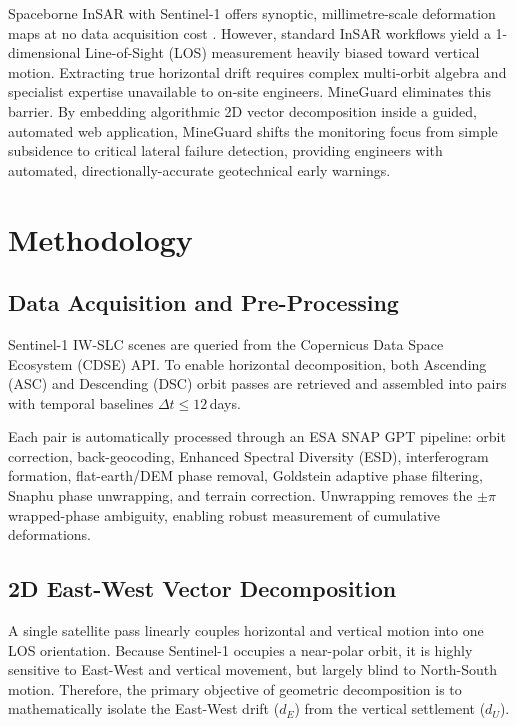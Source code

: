 \documentclass[conference]{IEEEtran}
\begin{document}
Spaceborne InSAR with Sentinel-1 offers synoptic, millimetre-scale
deformation maps at no data acquisition cost \cite{massonnet1998,
berardino2002}. However, standard InSAR workflows yield a 1-dimensional
Line-of-Sight (LOS) measurement heavily biased toward vertical motion.
Extracting true horizontal drift requires complex multi-orbit algebra
and specialist expertise unavailable to on-site engineers.
MineGuard eliminates this barrier. By embedding algorithmic 2D vector
decomposition inside a guided, automated web application, MineGuard
shifts the monitoring focus from simple subsidence to critical lateral
failure detection, providing engineers with automated, directionally-accurate
geotechnical early warnings.

\section{Methodology}

\subsection{Data Acquisition and Pre-Processing}
Sentinel-1 IW-SLC scenes are queried from the Copernicus Data Space
Ecosystem (CDSE) API. To enable horizontal decomposition, both Ascending
(ASC) and Descending (DSC) orbit passes are retrieved and assembled
into pairs with temporal baselines $\Delta t \leq 12$\,days.

Each pair is automatically processed through an ESA SNAP GPT pipeline:
orbit correction, back-geocoding, Enhanced Spectral Diversity (ESD),
interferogram formation, flat-earth/DEM phase removal, Goldstein
adaptive phase filtering, Snaphu phase unwrapping, and terrain
correction. Unwrapping removes the $\pm\pi$ wrapped-phase
ambiguity, enabling robust measurement of cumulative deformations.

\subsection{2D East-West Vector Decomposition}
A single satellite pass linearly couples horizontal and vertical
motion into one LOS orientation. Because Sentinel-1 occupies a
near-polar orbit, it is highly sensitive to East-West and vertical
movement, but largely blind to North-South motion. Therefore, the
primary objective of geometric decomposition is to mathematically
isolate the East-West drift ($d_E$) from the vertical settlement ($d_U$).
\end{document}
